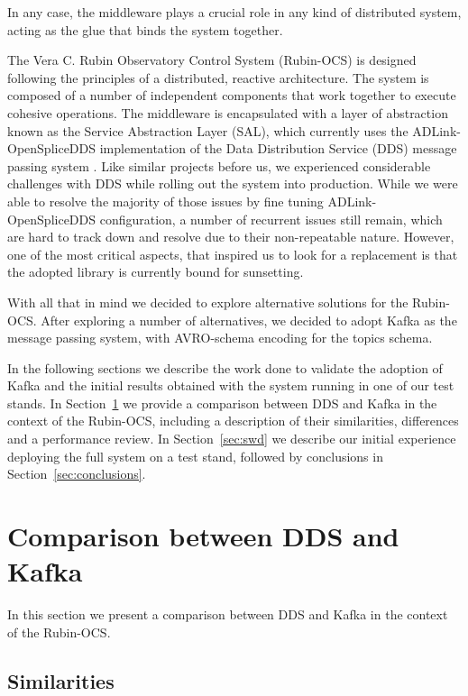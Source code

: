 \documentclass[]{spie}  %
\begin{document}
In any case, the middleware plays a crucial role in any kind of distributed system, acting as the glue that binds the system together.

The Vera C. Rubin Observatory\cite{2019ApJ...873..111I} Control System (Rubin-OCS) is designed following the principles of a distributed, reactive architecture.
The system is composed of a number of independent components that work together to execute cohesive operations.
The middleware is encapsulated with a layer of abstraction known as the Service Abstraction Layer (SAL), which currently uses the ADLink-OpenSpliceDDS implementation of the Data Distribution Service (DDS) message passing system \cite{2010SPIE.7740E..2CM}.
Like similar projects before us\cite{10.1117/12.2313106}, we experienced considerable challenges with DDS while rolling out the system into production.
While we were able to resolve the majority of those issues by fine tuning ADLink-OpenSpliceDDS configuration, a number of recurrent issues still remain, which are hard to track down and resolve due to their non-repeatable nature.
However, one of the most critical aspects, that inspired us to look for a replacement is that the adopted library is currently bound for sunsetting.

With all that in mind we decided to explore alternative solutions for the Rubin-OCS.
After exploring a number of alternatives, we decided to adopt Kafka as the message passing system, with AVRO-schema encoding for the topics schema.

In the following sections we describe the work done to validate the adoption of Kafka and the initial results obtained with the system running in one of our test stands.
In Section~\ref{sec:comparison} we provide a comparison between DDS and Kafka in the context of the Rubin-OCS, including a description of their similarities, differences and a performance review.
In Section~\ref{sec:swd} we describe our initial experience deploying the full system on a test stand, followed by conclusions in Section~\ref{sec:conclusions}.

\section{Comparison between DDS and Kafka}
\label{sec:comparison}

In this section we present a comparison between DDS and Kafka in the context of the Rubin-OCS.

\subsection{Similarities}
\label{subsec:similarities}
\end{document}
